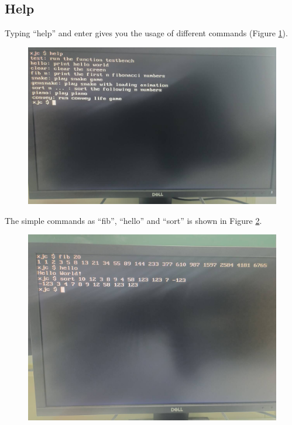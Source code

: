 \documentclass[
	a4paper, %
	11pt, %
]{CSUniSchoolLabReport}
\begin{document}
\subsection{Help}
Typing ``help'' and enter gives you the usage of different commands (Figure \ref{fig:image8}).
\begin{figure}[!htb]
    \centering
    \includegraphics[width=12cm]{image8.png}
    \label{fig:image8}
\end{figure}
The simple commands as ``fib'', ``hello'' and ``sort'' is shown in Figure \ref{fig:image10}.
\begin{figure}[!htb]
    \centering
    \includegraphics[width=12cm]{image10.png}
    \label{fig:image10}
\end{figure}
\end{document}
